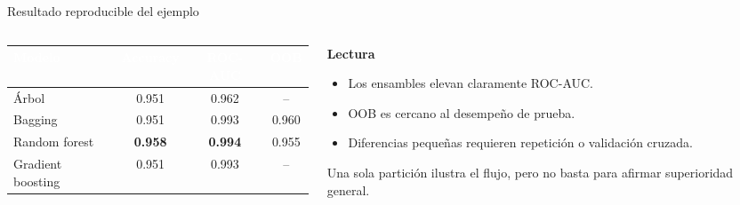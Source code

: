 \documentclass[aspectratio=169,11pt,table]{beamer}
\begin{document}
\begin{frame}{Resultado reproducible del ejemplo}
\begin{columns}[T,onlytextwidth]
\begin{column}{0.58\textwidth}
\vspace{2.20cm}
\renewcommand{\arraystretch}{1.32}
\footnotesize
\begin{tabular}{lccc}
\toprule
\rowcolor{ccdenavy}
\textcolor{white}{\textbf{Modelo}} &
\textcolor{white}{\textbf{Accuracy}} &
\textcolor{white}{\textbf{ROC-AUC}} &
\textcolor{white}{\textbf{OOB}}\\
\midrule
Árbol & 0.951 & 0.962 & --\\
\rowcolor{ccdeice!50}
Bagging & 0.951 & 0.993 & 0.960\\
Random forest & \textbf{0.958} & \textbf{0.994} & 0.955\\
\rowcolor{ccdeice!50}
Gradient boosting & 0.951 & 0.993 & --\\
\bottomrule
\end{tabular}
\end{column}
\begin{column}{0.38\textwidth}
\begin{keybox}
\textbf{Lectura}
\begin{itemize}
  \item Los ensambles elevan claramente ROC-AUC.
  \item OOB es cercano al desempeño de prueba.
  \item Diferencias pequeñas requieren repetición o validación cruzada.
\end{itemize}
\end{keybox}
\vspace{0cm}
\begin{ccdebox}
\footnotesize
Una sola partición ilustra el flujo, pero no basta para afirmar superioridad general.
\end{ccdebox}
\end{column}
\end{columns}
\vspace{0cm}
\end{frame}
\end{document}
